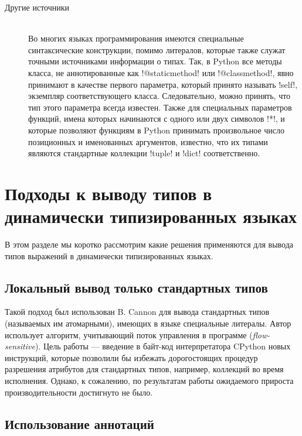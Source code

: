 \begin{description}
    \item[Другие источники] \hfill \\
        Во многих языках программирования имеются специальные синтаксические
        конструкции, помимо литералов, которые также служат точными источниками
        информации о типах. Так, в Python все методы класса, не аннотированные
        как !@staticmethod! или !@classmethod!, явно принимают в качестве первого
        параметра, который принято называть !self!, экземпляр соответствующего
        класса. Следовательно, можно принять, что тип этого параметра всегда
        известен.  Также для специальных параметров функций, имена которых
        начинаются с одного или двух символов !*!, и которые позволяют функциям в
        Python принимать произвольное число позиционных и именованных аргументов,
        известно, что их типами являются стандартные коллекции !tuple! и !dict!
        соответственно.

\end{description}
     
\section{Подходы к выводу типов в динамически типизированных языках}

В этом разделе мы коротко рассмотрим какие решения применяются для вывода
типов выражений в динамически типизированных языках.

\subsection{Локальный вывод только стандартных типов}

Такой подход был использован B. Cannon для вывода стандартных типов (называемых им
атомарными), имеющих в языке специальные литералы. Автор использует алгоритм,
учитывающий поток управления в программе (\emph{flow-sensitive}). Цель работы
--- введение в байт-код интерпретатора CPython новых инструкций, которые
позволили бы избежать дорогостоящих процедур разрешения атрибутов для
стандартных типов, например, коллекций во время исполнения. Однако, к сожалению,
по результатам работы ожидаемого прироста производительности достигнуто не было.

\subsection{Использование аннотаций}

